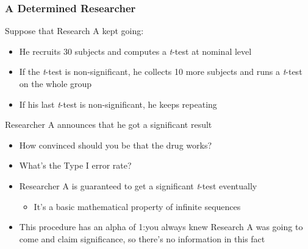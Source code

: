 \documentclass[10pt, block=fill]{beamer}
\begin{document}
\begin{frame}
   \frametitle{A Determined Researcher}
   
   Suppose that Research A kept going:
   \begin{itemize}
       \item He recruits 30 subjects and computes a \textit{t}-test at nominal level
       \item If the \textit{t}-test is non-significant, he collects 10 more subjects and runs a \textit{t}-test on the whole group
       \item If his last \textit{t}-test is non-significant, he keeps repeating 
   \end{itemize}
   
   \begin{exampleblock}{Researcher A announces that he got a significant result}
   \begin{itemize}
       \item How convinced should you be that the drug works?
       \item What's the Type I error rate?
   \end{itemize}
   \end{exampleblock}

   \begin{itemize}
       \item Researcher A is guaranteed to get a significant \textit{t}-test eventually
       \begin{itemize}
           \item It's a basic mathematical property of infinite sequences
       \end{itemize}
       \item This procedure has an alpha of 1:you always knew Research A was going to come and claim significance, so there's no information in this fact
   \end{itemize}
\end{frame}
\end{document}
